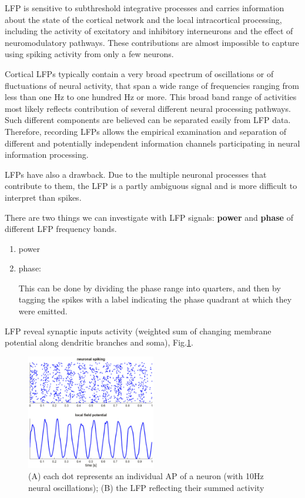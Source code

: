 LFP is sensitive to subthreshold integrative processes and carries information
about the state of the cortical network and the local intracortical processing,
including the activity of excitatory and inhibitory interneurons and the effect
of neuromodulatory pathways.
These contributions are almost impossible to capture using spiking activity from
only a few neurons.


Cortical LFPs typically contain a very broad spectrum of oscillations or of
fluctuations of neural activity, that span a wide range of frequencies ranging
from less than one Hz to one hundred Hz or more.
This broad band range of activities most likely reflects contribution of several
different neural processing pathways. Such different components are believed can
be separated easily from LFP data. Therefore, recording LFPs allows the
empirical examination and separation of different and potentially independent
information channels participating in neural information processing.

LFPs have also a drawback. Due to the multiple neuronal processes that
contribute to them, the LFP is a partly ambiguous signal and is more difficult
to interpret than spikes.

There are two things we can investigate with LFP signals: {\bf power} and
{\bf phase} of different LFP frequency bands.
\begin{enumerate}
  \item power
  
  

  \item phase:

This can be done by dividing the phase range into quarters, and then by tagging the spikes
with a label indicating the phase quadrant at which they were emitted. 

\end{enumerate}


LFP reveal synaptic inputs activity (weighted sum of changing membrane potential
along dendritic branches and soma),
Fig.\ref{fig:LFP}. 

\begin{figure}[hbt]
  \centerline{\includegraphics[height=5cm,
    angle=0]{./images/LFP.eps}}
\caption{(A) each dot represents an individual AP of a neuron (with 10Hz neural
oscillations); (B) the LFP reflecting their summed activity}
\label{fig:LFP}
\end{figure}


